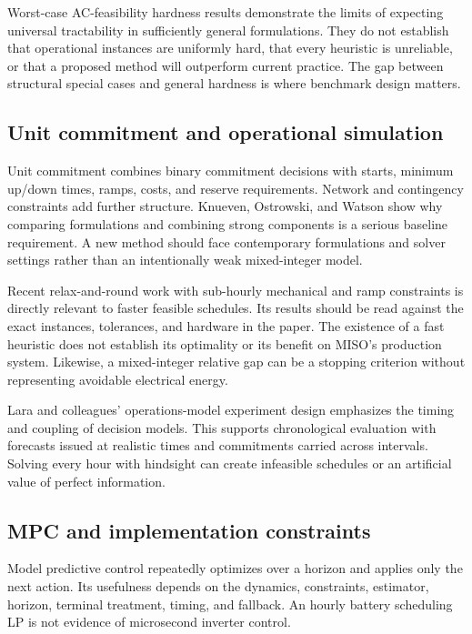 \documentclass[11pt,letterpaper]{article}
\begin{document}
Worst-case AC-feasibility hardness results demonstrate the limits of expecting universal tractability in sufficiently general formulations.\cite{hardness} They do not establish that operational instances are uniformly hard, that every heuristic is unreliable, or that a proposed method will outperform current practice. The gap between structural special cases and general hardness is where benchmark design matters.

\subsection{Unit commitment and operational simulation}
Unit commitment combines binary commitment decisions with starts, minimum up/down times, ramps, costs, and reserve requirements. Network and contingency constraints add further structure. Knueven, Ostrowski, and Watson show why comparing formulations and combining strong components is a serious baseline requirement.\cite{uc} A new method should face contemporary formulations and solver settings rather than an intentionally weak mixed-integer model.

Recent relax-and-round work with sub-hourly mechanical and ramp constraints is directly relevant to faster feasible schedules.\cite{round} Its results should be read against the exact instances, tolerances, and hardware in the paper. The existence of a fast heuristic does not establish its optimality or its benefit on MISO's production system. Likewise, a mixed-integer relative gap can be a stopping criterion without representing avoidable electrical energy.

Lara and colleagues' operations-model experiment design emphasizes the timing and coupling of decision models.\cite{experiment} This supports chronological evaluation with forecasts issued at realistic times and commitments carried across intervals. Solving every hour with hindsight can create infeasible schedules or an artificial value of perfect information.

\subsection{MPC and implementation constraints}
Model predictive control repeatedly optimizes over a horizon and applies only the next action. Its usefulness depends on the dynamics, constraints, estimator, horizon, terminal treatment, timing, and fallback. An hourly battery scheduling LP is not evidence of microsecond inverter control.
\end{document}
